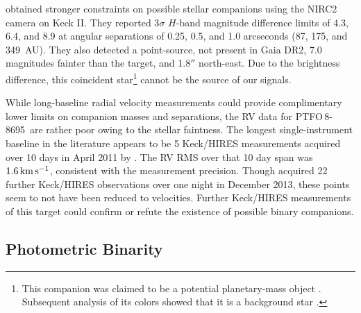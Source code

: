 \documentclass[12pt,twocolumn,tighten]{aastex62}
\newcommand{\ptfo}{PTFO$\,$8-8695}
\begin{document}
\citet{van_eyken_ptf_2012} obtained
stronger constraints on possible stellar companions using the
NIRC2 camera on Keck II.
They reported 3$\sigma$ $H$-band magnitude difference limits
of 4.3, 6.4, and 8.9 at angular separations of 0.25, 0.5, and 1.0
arcseconds (87, 175, and 349~AU).
They also detected a point-source, not present in Gaia DR2,
7.0 magnitudes fainter than the target, 
and 1.8$''$ north-east.
Due to the brightness difference, this coincident star\footnote{This companion was claimed to be a potential planetary-mass
	object \citep{schmidt_direct_2016}. Subsequent analysis of its colors showed that it is
	a background star \citep{lee_evidence_2018}.} cannot be the source
of our signals.




While long-baseline radial velocity measurements could provide complimentary
lower limits on companion masses and separations, the RV
data for \ptfo\ are rather poor owing to the stellar faintness.
The longest single-instrument baseline in the literature appears to be 5 Keck/HIRES
measurements acquired over 10 days in April 2011 by \citet{van_eyken_ptf_2012}.
The RV RMS over that 10 day span was $1.6\,{\rm km}\,{\rm s}^{-1}$, consistent with
the measurement precision.
Though \citet{yu_tests_2015} acquired 22 further Keck/HIRES observations over
one night in December 2013, these points seem to not have been
reduced to velocities.
Further Keck/HIRES measurements of this target could confirm or
refute the existence of possible binary companions.



\subsection{Photometric Binarity}
\end{document}
